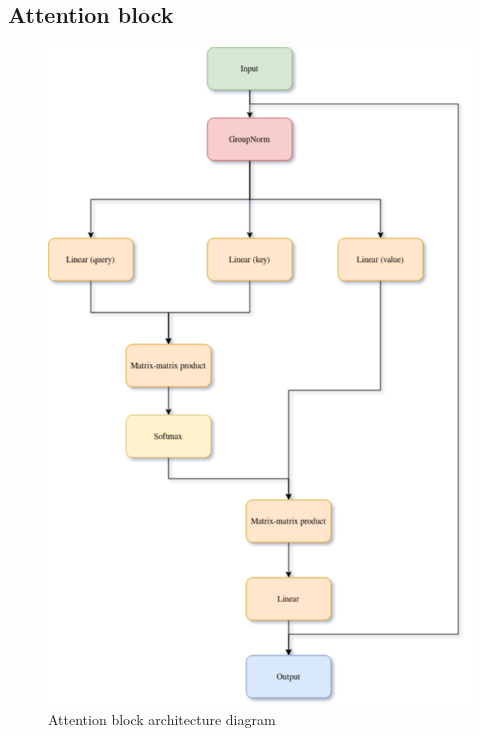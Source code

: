 \documentclass[11pt,a4paper]{report}
\begin{document}
\subsection{Attention block}
\begin{figure}[H]
	\centering
	\includegraphics[scale=0.6]{images/AttentionBlock.drawio}
    \caption{Attention block architecture diagram}
\end{figure}
\end{document}
